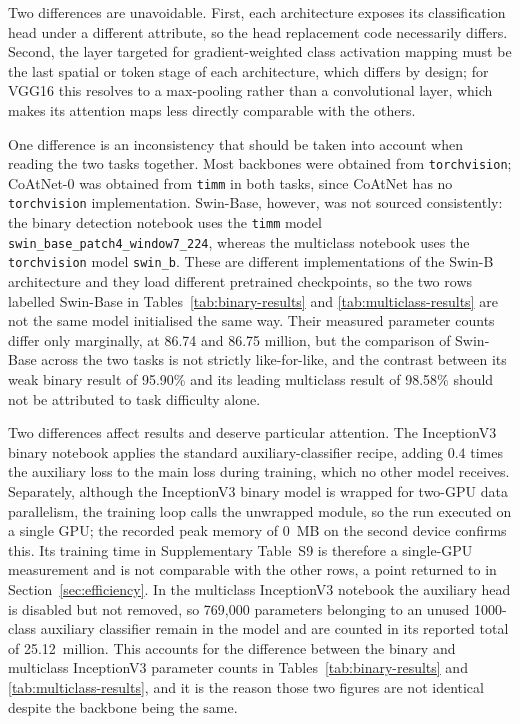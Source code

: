 \documentclass[final,3p,times,number]{elsarticle}
\begin{document}
Two differences are unavoidable. First, each architecture exposes its classification head under a different attribute, so the head replacement code necessarily differs. Second, the layer targeted for gradient-weighted class activation mapping must be the last spatial or token stage of each architecture, which differs by design; for VGG16 this resolves to a max-pooling rather than a convolutional layer, which makes its attention maps less directly comparable with the others.

One difference is an inconsistency that should be taken into account when reading the two tasks together. Most backbones were obtained from \texttt{torchvision}; CoAtNet-0 was obtained from \texttt{timm} in both tasks, since CoAtNet has no \texttt{torchvision} implementation. Swin-Base, however, was not sourced consistently: the binary detection notebook uses the \texttt{timm} model \texttt{swin\_base\_patch4\_window7\_224}, whereas the multiclass notebook uses the \texttt{torchvision} model \texttt{swin\_b}. These are different implementations of the Swin-B architecture and they load different pretrained checkpoints, so the two rows labelled Swin-Base in Tables~\ref{tab:binary-results} and \ref{tab:multiclass-results} are not the same model initialised the same way. Their measured parameter counts differ only marginally, at 86.74 and 86.75 million, but the comparison of Swin-Base across the two tasks is not strictly like-for-like, and the contrast between its weak binary result of 95.90\% and its leading multiclass result of 98.58\% should not be attributed to task difficulty alone.

Two differences affect results and deserve particular attention. The InceptionV3 binary notebook applies the standard auxiliary-classifier recipe, adding $0.4$ times the auxiliary loss to the main loss during training, which no other model receives. Separately, although the InceptionV3 binary model is wrapped for two-GPU data parallelism, the training loop calls the unwrapped module, so the run executed on a single GPU; the recorded peak memory of 0~MB on the second device confirms this. Its training time in Supplementary Table~S9 is therefore a single-GPU measurement and is not comparable with the other rows, a point returned to in Section~\ref{sec:efficiency}. In the multiclass InceptionV3 notebook the auxiliary head is disabled but not removed, so 769,000 parameters belonging to an unused 1000-class auxiliary classifier remain in the model and are counted in its reported total of 25.12~million. This accounts for the difference between the binary and multiclass InceptionV3 parameter counts in Tables~\ref{tab:binary-results} and \ref{tab:multiclass-results}, and it is the reason those two figures are not identical despite the backbone being the same.
\end{document}
